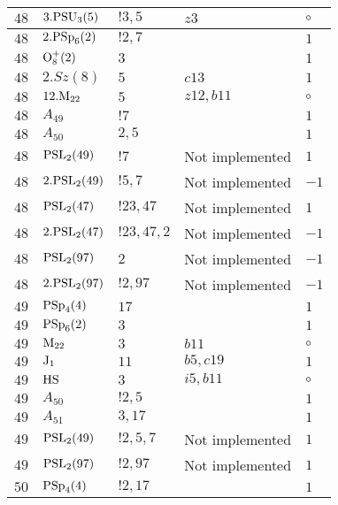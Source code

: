 \documentclass[a4paper, 11pt]{article}
\begin{document}
\begin{longtable}{lllll}
        $ 48 $ & $ 3.{\rm PSU}_{3}(5) $ & $ ! 3,5 $ & $ z3 $ &  $\circ$ \\ \hline
        $ 48 $ & $ 2.{\rm PSp}_{6}(2) $ & $ ! 2,7 $ & $ ~ $ & $ 1$ \\ \hline
        $ 48 $ & $ {\rm O}_{8}^+(2) $ & $ 3 $ & $ ~ $ & $ 1$ \\ \hline
        $ 48 $ & $ 2.Sz(8) $ & $ 5 $ & $ c13 $ & $ 1$ \\ \hline
        $ 48 $ & $ 12.{\rm M}_{22} $ & $ 5 $ & $ z12, b11 $ &  $\circ$ \\ \hline
        $ 48 $ & $ A_{49} $ & $ !7 $ & $ ~ $ & $ 1$ \\ \hline
        $ 48 $ & $ A_{50} $ & $ 2, 5 $ & $ ~ $ & $ 1$ \\ \hline
        $ 48 $ & $ {\rm PSL}_{2}(49) $ & $ !7 $ &  Not implemented & $ 1$ \\ \hline
        $ 48 $ & $ 2.{\rm PSL}_{2}(49) $ & $ !5, 7 $ &  Not implemented & $ -1$ \\ \hline
        $ 48 $ & $ {\rm PSL}_{2}(47) $ & $ !23, 47 $ &  Not implemented & $ 1$ \\ \hline
        $ 48 $ & $ 2.{\rm PSL}_{2}(47) $ & $ !23, 47, 2 $ &  Not implemented & $ -1$ \\ \hline
        $ 48 $ & $ {\rm PSL}_{2}(97) $ & $ 2 $ &  Not implemented & $ -1$ \\ \hline
        $ 48 $ & $ 2.{\rm PSL}_{2}(97) $ & $ !2, 97 $ &  Not implemented & $ -1$ \\ \hline
        $ 49 $ & $ {\rm PSp}_{4}(4) $ & $ 17 $ & $ ~ $ & $ 1$ \\ \hline
        $ 49 $ & $ {\rm PSp}_{6}(2) $ & $ 3 $ & $ ~ $ & $ 1$ \\ \hline
        $ 49 $ & $ {\rm M}_{22} $ & $ 3 $ & $ b11 $ &  $\circ$ \\ \hline
        $ 49 $ & $ {\rm J}_1 $ & $ 11 $ & $ b5, c19 $ & $ 1$ \\ \hline
        $ 49 $ & $ {\rm HS} $ & $ 3 $ & $ i5, b11 $ &  $\circ$ \\ \hline
        $ 49 $ & $ A_{50} $ & $ !2, 5 $ & $ ~ $ & $ 1$ \\ \hline
        $ 49 $ & $ A_{51} $ & $ 3, 17 $ & $ ~ $ & $ 1$ \\ \hline
        $ 49 $ & $ {\rm PSL}_{2}(49) $ & $ !2, 5, 7 $ &  Not implemented & $ 1$ \\ \hline
        $ 49 $ & $ {\rm PSL}_{2}(97) $ & $ !2, 97 $ &  Not implemented & $ 1$ \\ \hline
        $ 50 $ & $ {\rm PSp}_{4}(4) $ & $ ! 2,17 $ & $ ~ $ & $ 1$ \\ \hline

\end{longtable}
\end{document}
